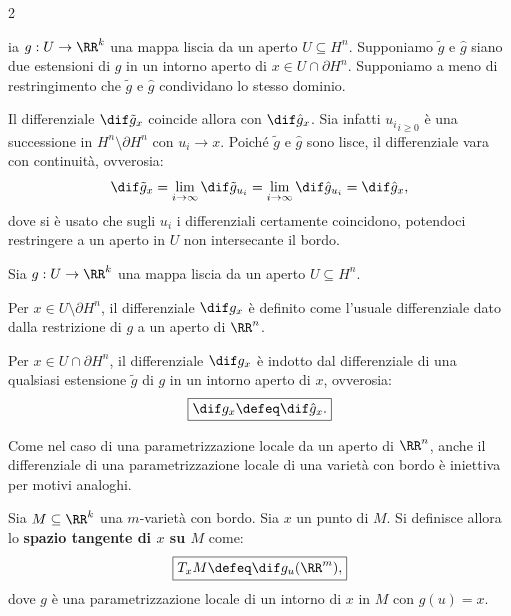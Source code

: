 \begin{multicols*}{2}
    \begin{remark}
        ia $g : U \to \RR^k$ una mappa liscia da un aperto $U \subseteq H^n$.
        Supponiamo $\tilde{g}$ e $\hat{g}$ siano due estensioni di $g$ in
        un intorno aperto di $x \in U \cap \partial H^n$. Supponiamo a meno di restringimento
        che $\tilde{g}$ e $\hat{g}$ condividano lo stesso dominio. \smallskip

        Il differenziale $\dif \tilde{g}_x$ coincide allora con
        $\dif \hat{g}_x$. Sia infatti ${u_i}_{i \geq 0}$ è una successione
        in $H^n \setminus \partial H^n$ con $u_i \to x$. Poiché $\tilde{g}$
        e $\hat{g}$ sono lisce, il differenziale vara con continuità, ovverosia:
        \[
            \dif \tilde{g}_x = \lim_{i \to \infty} \dif \tilde{g}_{u_i} =
            \lim_{i \to \infty} \dif \hat{g}_{u_i} = \dif \hat{g}_x,
        \]
        dove si è usato che sugli $u_i$ i differenziali certamente coincidono,
        potendoci restringere a un aperto in $U$ non intersecante il bordo.
    \end{remark}

    \begin{definition}[Differenziale su $H^n$]
        Sia $g : U \to \RR^k$ una mappa liscia da un aperto $U \subseteq H^n$. \smallskip

        Per $x \in U \setminus \partial H^n$, il differenziale $\dif g_x$ è
        definito come l'usuale differenziale dato dalla restrizione di $g$ a un aperto
        di $\RR^n$. \smallskip

        Per $x \in U \cap \partial H^n$, il differenziale $\dif g_x$ è indotto dal
        differenziale di una qualsiasi estensione $\tilde{g}$ di $g$ in un intorno
        aperto di $x$, ovverosia:
        \[
            \boxed{\dif g_x \defeq \dif \hat{g}_x.}
        \]
    \end{definition}

    \begin{remark}
        Come nel caso di una parametrizzazione locale da un aperto di $\RR^n$,
        anche il differenziale di una parametrizzazione locale di una varietà con
        bordo è iniettiva per motivi analoghi.
    \end{remark}

    \begin{definition}
        Sia $M \subseteq \RR^k$ una $m$-varietà con bordo. Sia
        $x$ un punto di $M$. Si definisce allora lo \textbf{spazio tangente
            di $x$ su $M$} come:
        \[
            \boxed{T_x M \defeq \dif g_u(\RR^m),}
        \]
        dove $g$ è una parametrizzazione locale di un intorno di $x$ in $M$
        con $g(u) = x$.
    \end{definition}


\end{multicols*}
